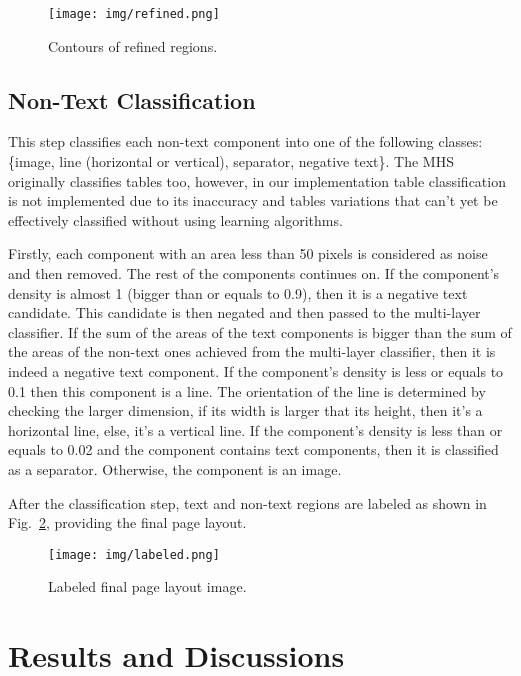 \documentclass[conference]{IEEEtran}
\begin{document}
    \begin{figure}[htbp]
        \centerline{\texttt{[image: img/refined.png]}}
        \caption{Contours of refined regions.}
        \label{img:refined}
    \end{figure}

    \subsection{Non-Text Classification}

    This step classifies each non-text component into one of the following classes:
    \{image, line (horizontal or vertical), separator, negative text\}.
    The MHS originally classifies tables too, however, in our implementation table
    classification is not implemented due to its inaccuracy and tables variations
    that can't yet be effectively classified without using learning algorithms.
    
    Firstly, each component with an area less than 50 pixels is considered as noise
    and then removed.
    The rest of the components continues on.
    If the component's density is almost 1 (bigger than or equals to 0.9), then
    it is a negative text candidate.
    This candidate is then negated and then passed to the multi-layer classifier.
    If the sum of the areas of the text components is bigger than the sum of the
    areas of the non-text ones achieved from the multi-layer classifier, then it
    is indeed a negative text component.
    If the component's density is less or equals to 0.1 then this component is a line.
    The orientation of the line is determined by checking the larger dimension,
    if its width is larger that its height, then it's a horizontal line, else, it's
    a vertical line.
    If the component's density is less than or equals to 0.02 and the component
    contains text components, then it is classified as a separator.
    Otherwise, the component is an image.

    After the classification step, text and non-text regions are labeled as shown
    in Fig.~\ref{img:labeled}, providing the final page layout.

    \begin{figure}[htbp]
        \centerline{\texttt{[image: img/labeled.png]}}
        \caption{Labeled final page layout image.}
        \label{img:labeled}
    \end{figure}

    \section{Results and Discussions}\label{sect:3}
    
\end{document}
